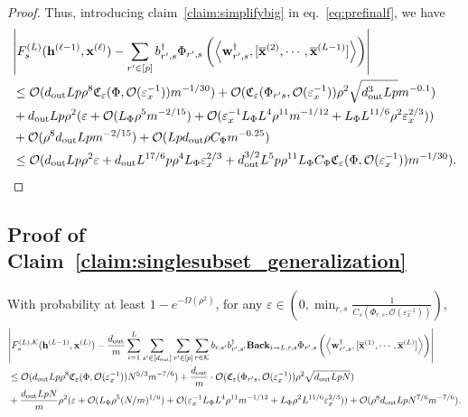 \begin{proof}
			Thus, introducing claim~\ref{claim:simplifybig} in eq.~\ref{eq:prefinalf}, we have
			\begingroup \allowdisplaybreaks
			\begin{align*}
				&\abs{ F_s^{(L)}(\mathbf{h}^{(\ell-1)}, \mathbf{x}^{(\ell)}) - \sum_{r' \in [p]}  b_{r', s}^{\dagger} \Phi_{r', s} \left(\left\langle \mathbf{w}_{r', s}^{\dagger}, [\overline{\mathbf{x}}^{(2)}, \cdots, \overline{\mathbf{x}}^{(L-1)}]\right\rangle\right) } \\& \le \mathcal{O}(d_{\mathrm{out}} Lp\rho^8  \mathfrak{C}_{\varepsilon}(\Phi, \mathcal{O}(\varepsilon_x^{-1}))  m^{-1/30}) + \mathcal{O}(\mathfrak{C}_{\varepsilon}(\Phi_{r' s}, \mathcal{O}(\varepsilon_x^{-1})) \rho^2 \sqrt{d_{\mathrm{out}} ^3Lp} m^{-0.1}) \\& + d_{\mathrm{out}} Lp \rho^2 (\varepsilon + \mathcal{O}( L_{\Phi}\rho^5 m^{-2/15}) + \mathcal{O}(\varepsilon_x^{-1} L_{\Phi} L^4 \rho^{11} m^{-1/12} +  L_{\Phi} L^{11/6} \rho^2 \varepsilon_x^{2/3})) \\& + \mathcal{O}(\rho^8d_{\mathrm{out}} Lp  m^{-2/15})  + \mathcal{O}(Lpd_{\mathrm{out}}  \rho C_{\Phi} m^{-0.25}) \\&
				\le \mathcal{O}(d_{\mathrm{out}} Lp\rho^2 \varepsilon + d_{\mathrm{out}} L^{17/6} p \rho^4 L_{\Phi} \varepsilon_x^{2/3} + d_{\mathrm{out}} ^{3/2} L^5 p \rho^{11} L_{\Phi} C_{\Phi}  \mathfrak{C}_{\varepsilon}(\Phi, \mathcal{O}(\varepsilon_x^{-1}))  m^{-1/30} ) .
			\end{align*}
			\endgroup
		\end{proof}





\subsection{Proof of Claim~\ref{claim:singlesubset_generalization}}

\begin{claim}\label{claim:singlesubset_generalization_proof}
	With probability at least $1-e^{-\Omega(\rho^2)}$, for any $\varepsilon \in (0, \min_{r, s} \frac{1}{C_s(\Phi_{r, s}, \mathcal{O}(\varepsilon_x^{-1}) ) })$,
	\begin{align*}      &\abs{F^{(L), \mathcal{K}}_s(\mathbf{h}^{(L-1)}, \mathbf{x}^{(L)}) - \frac{d_{\mathrm{out}} }{m} \sum_{i=1}^{L}  \sum_{s' \in [d_{\mathrm{out}} ]} \sum_{r' \in [p]} \sum_{r \in \mathcal{K}}  b_{r, s'} b_{r', s'}^{\dagger} \mathbf{Back}_{i \to L, r, s} \Phi_{r', s} \left(\left\langle \mathbf{w}_{r', s}^{\dagger}, [\overline{\mathbf{x}}^{(1)}, \cdots, \overline{\mathbf{x}}^{(L)}]\right\rangle\right)} \\&\le  \mathcal{O}(d_{\mathrm{out}} Lp\rho^8  \mathfrak{C}_{\varepsilon}(\Phi, \mathcal{O}(\varepsilon_x^{-1})) N^{5/3} m^{-7/6}) + \frac{d_{\mathrm{out}} }{m} \cdot \mathcal{O}(\mathfrak{C}_{\varepsilon}(\Phi_{r' s}, \mathcal{O}(\varepsilon_x^{-1})) \rho^2 \sqrt{d_{\mathrm{out}} LpN}) \\& + \frac{d_{\mathrm{out}} LpN}{m} \rho^2 (\varepsilon + \mathcal{O}( L_{\Phi}\rho^5 (N/m)^{1/6}) + \mathcal{O}(\varepsilon_x^{-1} L_{\Phi} L^4 \rho^{11} m^{-1/12} +  L_{\Phi} \rho^2 L^{11/6} \varepsilon_x^{2/3})) + \mathcal{O}(\rho^8d_{\mathrm{out}} Lp N^{7/6} m^{-7/6}) .
	\end{align*}
\end{claim}

